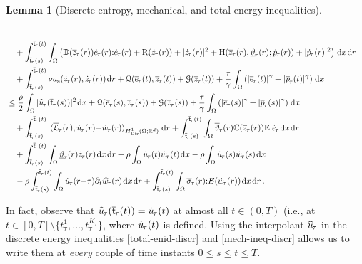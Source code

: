 \documentclass[a4paper,10pt,reqno]{amsart}
\numberwithin{equation}{section}
\newcommand{\R}{\mathbb{R}}
\numberwithin{equation}{section}
\newtheorem{lemma}[theorem]{Lemma}
\def\calG{{\mathcal G}} \def\calH{{\mathcal H}} \def\calI{{\mathcal I}}
\def\dd{\;\!\mathrm{d}} %
\newcommand{\pairing}[4]{ \sideset{_{ #1 }}{_{ #2 }}  {\mathop{\langle #3 , #4
\rangle}}}
\newcommand{\teta}{\vartheta}
\newcommand{\piecewiseConstant}[2]{\overline{#1}_{\kern-1pt#2}}
\newcommand{\pwc}{\piecewiseConstant}
\newcommand{\upiecewiseConstant}[2]{\underline{#1}_{\kern-1pt#2}}
\newcommand{\upwc}{\upiecewiseConstant}
\newcommand{\piecewiseLinear}[2]{{#1}_{\kern-1pt#2}}
\newcommand{\pwl}{\piecewiseLinear}
\newcommand{\pwwll}[2]{\widehat{#1}_{\kern-1pt#2}}
\newcommand{\sig}[1]{E(#1)}
\newcommand{\Dir}{\mathrm{Dir}}
\newcommand{\bbC}{\mathbb{C}}
\newcommand{\bbD}{\mathbb{D}}
\newcommand{\bbE}{\mathbb{E}}
\newcommand{\dip}[3]{\mathrm{H}(#1,#2;#3)}
\newcommand{\did}[1]{\mathrm{R}(#1)}
\newcommand{\ass}{a_{\mathrm{s}}}
\begin{document}
\begin{lemma}[Discrete entropy, mechanical, and  total energy inequalities]
\begin{itemize}
\begin{equation}
\begin{aligned}
\\
&\quad +  \int_{\pwc{\mathsf{t}}{\tau}(s)}^{\pwc{\mathsf{t}}{\tau}(t)} \int_\Omega
 \left( \bbD(\pwc z\tau(r)) \pwl{\dot e}\tau(r) {:} \pwl{\dot e}\tau(r) 
+\did{\pwl{\dot z}\tau(r)} + |\pwl{\dot z}\tau(r)|^2  + \dip{\pwc z\tau(r)}{\upwc\teta\tau(r)}{
 \pwl{\dot p}\tau(r)} + |\pwl{\dot p}\tau(r)|^2  \right)  \dd x \dd r
 \\
 & \quad 
+ \int_{\pwc{\mathsf{t}}{\tau}(s)}^{\pwc{\mathsf{t}}{\tau}(t)}  \nu \ass (\pwl{\dot z}\tau(r), \pwl{\dot z}\tau(r)) \dd r  +\calQ(\pwc e\tau(t), \pwc z\tau(t)) + \calG(\pwc z\tau(t)) 
 + \frac{\tau}\gamma\int_\Omega \left(  |\pwc e\tau(t)|^\gamma +  |\pwc p\tau(t)|^\gamma \right) \dd x 
\\ &  \leq 
 \frac{\rho}2 \int_\Omega | \pwwll {u}{\tau}(\pwc{\mathsf{t}}{\tau}(s))|^2 \dd x + \calQ(\pwc e\tau(s), \pwc z\tau(s)) + \calG(\pwc z\tau(s)) 
 + \frac{\tau}\gamma\int_\Omega \left(  |\pwc e\tau(s)|^\gamma +  |\pwc p\tau(s)|^\gamma \right) \dd x 
\\ & \quad +
    \int_{\pwc{\mathsf{t}}{\tau}(s)}^{\pwc{\mathsf{t}}{\tau}(t)} \pairing{}{H_\Dir^1(\Omega;\R^d)}{\pwc \calL \tau (r) }{\pwl{\dot u}\tau (r){-} \pwl{\dot w}\tau (r)  } \dd r
    + \int_{\pwc{\mathsf{t}}{\tau}(s)}^{\pwc{\mathsf{t}}{\tau}(t)} \int_\Omega \pwc\teta\tau(r) \bbC (\pwc z\tau(r)) \bbE {:} \pwl{\dot e}\tau \dd x  \dd r
     \\ &  \quad
       + \int_{\pwc{\mathsf{t}}{\tau}(s)}^{\pwc{\mathsf{t}}{\tau}(t)} \int_\Omega \upwc\teta\tau(r)   \pwl {\dot z}\tau(r) \dd x \dd r 
      +\rho \int_\Omega \pwl{\dot u}\tau(t) \pwl{\dot w }\tau(t) \dd x -  \rho \int_\Omega \pwl{\dot u}\tau(s)   \pwl{\dot w }\tau(s) \dd x 
     \\ & \quad
   - \rho  \int_{\pwc{\mathsf{t}}{\tau}(s)}^{\pwc{\mathsf{t}}{\tau}(t)} \int_\Omega  \pwl{\dot u}\tau(r{-}\tau)  \partial_t \pwwll{w}\tau (r)  \dd x \dd r   +   \int_{\pwc{\mathsf{t}}{\tau}(s)}^{\pwc{\mathsf{t}}{\tau}(t)}\int_\Omega \pwc \sigma\tau (r) {:} \sig{\pwl{\dot w}\tau (r) }  \dd x \dd r\,.  %
 \end{aligned}
\end{equation} 
 \end{itemize}
 \end{lemma}
 \noindent 
 In fact, observe that $\pwwll {u}{\tau}(\pwc{\mathsf{t}}{\tau}(t)) = \pwl{\dot u}{\tau}(t)$  at  almost  all  $t\in (0,T)$ (i.e., at $t \in [0,T] \setminus \{ t_\tau^1, \ldots, t_\tau^{K_\tau}\}$, where  $ \pwl{\dot u}{\tau}(t)$  is defined. Using the interpolant $\pwwll {u}{\tau}$ in the discrete energy inequalities \eqref{total-enid-discr} and \eqref{mech-ineq-discr} allows us to write them at \emph{every} couple of time instants $ 0 \leq s \leq t \leq T$. 
\end{document}
